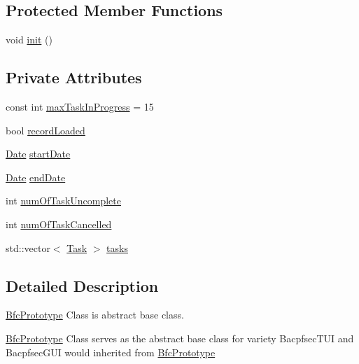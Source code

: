 \subsection*{Protected Member Functions}
\begin{DoxyCompactItemize}
\item 
void \hyperlink{classBfcPrototype_a8708a39c0aba8aa6d2987c17ec282f7b}{init} ()
\end{DoxyCompactItemize}
\subsection*{Private Attributes}
\begin{DoxyCompactItemize}
\item 
const int \hyperlink{classBfcPrototype_a9549b48b56475a2f2a1bded3f3ac09a4}{max\-Task\-In\-Progress} = 15
\item 
bool \hyperlink{classBfcPrototype_ac719ad28f80b4c8955ba516ac68471cc}{record\-Loaded}
\item 
\hyperlink{classDate}{Date} \hyperlink{classBfcPrototype_a636fde08f1c5518862f9d2603f73ebae}{start\-Date}
\item 
\hyperlink{classDate}{Date} \hyperlink{classBfcPrototype_a88db45d376d68c919a7a43e92adf4e23}{end\-Date}
\item 
int \hyperlink{classBfcPrototype_ab506fb074e721612c0838e2c37c93e09}{num\-Of\-Task\-Uncomplete}
\item 
int \hyperlink{classBfcPrototype_a1b1f3d0e3410f241e63884c11e36451a}{num\-Of\-Task\-Cancelled}
\item 
std\-::vector$<$ \hyperlink{classTask}{Task} $>$ \hyperlink{classBfcPrototype_a2724416668b0a82b442df12f90360e95}{tasks}
\end{DoxyCompactItemize}


\subsection{Detailed Description}
\hyperlink{classBfcPrototype}{Bfc\-Prototype} Class is abstract base class. 

\hyperlink{classBfcPrototype}{Bfc\-Prototype} Class serves as the abstract base class for variety Bacpfsec\-T\-U\-I and Bacpfsec\-G\-U\-I would inherited from \hyperlink{classBfcPrototype}{Bfc\-Prototype} 

